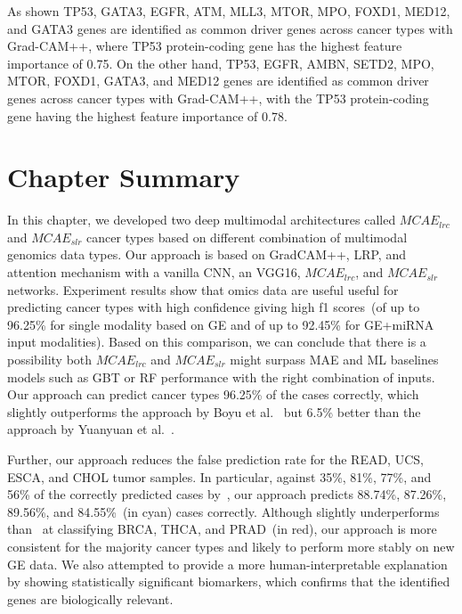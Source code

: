 \hspace*{3.5mm} As shown TP53, GATA3, EGFR, ATM, MLL3, MTOR, MPO, FOXD1, MED12, and GATA3 genes are identified as common driver genes across cancer types with Grad-CAM++, where TP53 protein-coding gene has the highest feature importance of 0.75. On the other hand, TP53, EGFR, AMBN, SETD2, MPO, MTOR, FOXD1, GATA3, and MED12 genes are identified as common driver genes across cancer types with Grad-CAM++, with the TP53 protein-coding gene having the highest feature importance of 0.78. 

\section{Chapter Summary}\label{chapter_5:conclusion}
In this chapter, we developed two deep multimodal architectures called $MCAE_{lrc}$ and $MCAE_{slr}$ cancer types based on different combination of multimodal genomics data types. Our approach is based on GradCAM++, LRP, and attention mechanism with a vanilla CNN, an VGG16, $MCAE_{lrc}$, and $MCAE_{slr}$ networks. Experiment results show that omics data are useful useful for predicting cancer types with high confidence giving high f1 scores~(of up to 96.25\% for single modality based on GE and of up to 92.45\% for GE+miRNA input modalities). Based on this comparison, we can conclude that there is a possibility both $MCAE_{lrc}$ and $MCAE_{slr}$ might surpass MAE and ML baselines models such as GBT or RF performance with the right combination of inputs. 
Our approach can predict cancer types 96.25\% of the cases correctly, which slightly outperforms the approach by Boyu et al.~\cite{lyu2018deep} but 6.5\% better than the approach by Yuanyuan et al.~\cite{li2017comprehensive}. 

\hspace*{3.5mm}Further, our approach reduces the false prediction rate for the READ, UCS, ESCA, and CHOL tumor samples. In particular, against 35\%, 81\%, 77\%, and 56\% of the correctly predicted cases by~\cite{lyu2018deep}, our approach predicts 88.74\%, 87.26\%, 89.56\%, and 84.55\%~(in cyan) cases correctly. Although slightly underperforms than~\cite{lyu2018deep} at classifying BRCA, THCA, and PRAD~(in red), our approach is more consistent for the majority cancer types and likely to perform more stably on new GE data. We also attempted to provide a more human-interpretable explanation by showing statistically significant biomarkers, which confirms that the identified genes are biologically relevant. 

